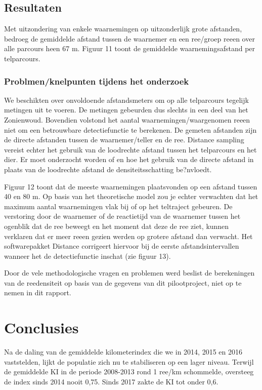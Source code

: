 \documentclass[twoside]{extreport}
\begin{document}
\section{Resultaten}\label{resultaten-1}

Met uitzondering van enkele waarnemingen op uitzonderlijk grote
afstanden, bedroeg de gemiddelde afstand tussen de waarnemer en een
ree/groep reeen over alle parcours heen 67 m. Figuur 11 toont de
gemiddelde waarnemingsafstand per telparcours.

\subsection{Problmen/knelpunten tijdens het
onderzoek}\label{problmenknelpunten-tijdens-het-onderzoek}

We beschikten over onvoldoende afstandsmeters om op alle telparcours
tegelijk metingen uit te voeren. De metingen gebeurden dus slechts in
een deel van het Zonienwoud. Bovendien volstond het aantal
waarnemingen/waargenomen reeen niet om een betrouwbare detectiefunctie
te berekenen. De gemeten afstanden zijn de directe afstanden tussen de
waarnemer/teller en de ree. Distance sampling vereist echter het gebruik
van de loodrechte afstand tussen het telparcours en het dier. Er moet
onderzocht worden of en hoe het gebruik van de directe afstand in plaats
van de loodrechte afstand de densiteitsschatting be?nvloedt.

Figuur 12 toont dat de meeste waarnemingen plaatsvonden op een afstand
tussen 40 en 80 m. Op basis van het theoretische model zou je echter
verwachten dat het maximum aantal waarnemingen vlak bij of op het
teltraject gebeuren. De verstoring door de waarnemer of de reactietijd
van de waarnemer tussen het ogenblik dat de ree beweegt en het moment
dat deze de ree ziet, kunnen verklaren dat er meer reeen gezien werden
op grotere afstand dan verwacht. Het softwarepakket Distance corrigeert
hiervoor bij de eerste afstandsintervallen wanneer het de
detectiefunctie inschat (zie figuur 13).

Door de vele methodologische vragen en problemen werd beslist de
berekeningen van de reedensiteit op basis van de gegevens van dit
pilootproject, niet op te nemen in dit rapport.

\chapter{Conclusies}\label{conclusies}

Na de daling van de gemiddelde kilometerindex die we in 2014, 2015 en
2016 vaststelden, lijkt de populatie zich nu te stabiliseren op een
lager niveau. Terwijl de gemiddelde KI in de periode 2008-2013 rond 1
ree/km schommelde, oversteeg de index sinds 2014 nooit 0,75. Sinds 2017
zakte de KI tot onder 0,6.
\end{document}
